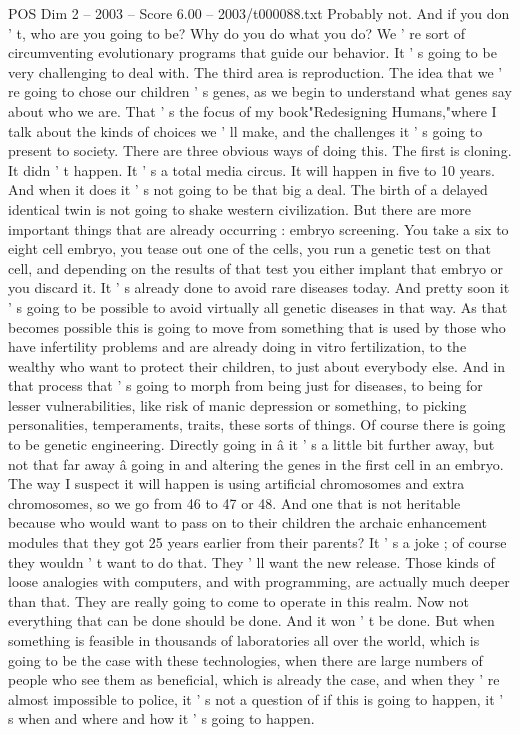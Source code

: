 \begin{textsample}{POS Dim 2 – 2003 – Score 6.00 – 2003/t000088.txt}
Probably not.
And if you don ' t, who are you going to be?
Why do you do what you do?
We ' re sort of circumventing evolutionary programs that guide our behavior.
It ' s going to be very challenging to deal with.
The third area is reproduction.
The idea that we ' re going to chose our children ' s genes, as we begin to understand what genes say about who we are.
That ' s the focus of my book"Redesigning Humans,"where I talk about the kinds of choices we ' ll make, and the challenges it ' s going to present to society.
There are three obvious ways of doing this.
The first is cloning.
It didn ' t happen.
It ' s a total media circus.
It will happen in five to 10 years.
And when it does it ' s not going to be that big a deal.
The birth of a delayed identical twin is not going to shake western civilization.
But there are more important things that are already occurring : embryo screening.
You take a six to eight cell embryo, you tease out one of the cells, you run a genetic test on that cell, and depending on the results of that test you either implant that embryo or you discard it.
It ' s already done to avoid rare diseases today.
And pretty soon it ' s going to be possible to avoid virtually all genetic diseases in that way.
As that becomes possible this is going to move from something that is used by those who have infertility problems and are already doing in vitro fertilization, to the wealthy who want to protect their children, to just about everybody else.
And in that process that ' s going to morph from being just for diseases, to being for lesser vulnerabilities, like risk of manic depression or something, to picking personalities, temperaments, traits, these sorts of things.
Of course there is going to be genetic engineering.
Directly going in â it ' s a little bit further away, but not that far away â going in and altering the genes in the first cell in an embryo.
The way I suspect it will happen is using artificial chromosomes and extra chromosomes, so we go from 46 to 47 or 48.
And one that is not heritable because who would want to pass on to their children the archaic enhancement modules that they got 25 years earlier from their parents?
It ' s a joke ; of course they wouldn ' t want to do that.
They ' ll want the new release.
Those kinds of loose analogies with computers, and with programming, are actually much deeper than that.
They are really going to come to operate in this realm.
Now not everything that can be done should be done.
And it won ' t be done.
But when something is feasible in thousands of laboratories all over the world, which is going to be the case with these technologies, when there are large numbers of people who see them as beneficial, which is already the case, and when they ' re almost impossible to police, it ' s not a question of if this is going to happen, it ' s when and where and how it ' s going to happen.

\end{textsample}
